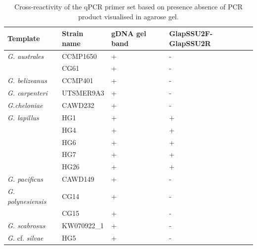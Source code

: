 \documentclass[12pt]{article}
\begin{document}
\begin{table}
\caption{Cross-reactivity of the qPCR primer set based on presence absence of PCR product visualised in agarose gel.}
\label{tbl:CrossreactTable}
\begin{tabular}{ | p{4cm} | p{3cm} | p{2cm} | p{2.5cm} | }%
\hline
\textbf{Template} & \textbf{Strain name} & \textbf{gDNA gel band} & \textbf{GlapSSU2F-GlapSSU2R} \\%
\hline
\emph{G. australes} & CCMP1650 &+&-\\%
\hline
& CG61 &+&-\\%
\hline
\emph{G. belizeanus}&CCMP401&+&-\\%
\hline
\emph{G. carpenteri}&UTSMER9A3&+&-\\%
\hline
\emph{G.cheloniae}&CAWD232&+&-\\%
\hline
\emph{G. lapillus}&HG1&+&+\\%
\hline
&HG4&+&+\\%
\hline
&HG6&+&+\\%
\hline
&HG7&+&+\\%
\hline
&HG26&+&+\\%
\hline
\emph{G. pacificus}&CAWD149&+&-\\%
\hline
\emph{G. polynesiensis}&CG14&+&-\\%
\hline
&CG15&+&-\\%
\hline
\emph{G. scabrosus}&KW070922\_1&+&-\\%
\hline
\emph{G.} cf. \emph{silvae}&HG5&+&-\\%
\hline
\end{tabular}
\end{table}
\FloatBarrier
\end{document}
